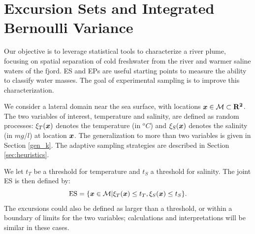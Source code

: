 \documentclass[aoas]{imsart}
\begin{document}






\section{Excursion Sets and Integrated Bernoulli Variance}
\label{sec:ESEP}

Our objective is to leverage statistical tools to characterize a river
plume, focusing on spatial separation of cold freshwater from the
river and warmer saline waters of the fjord. ES and EPs are useful
starting points to measure the ability to classify water masses. The
goal of experimental sampling is to improve this
characterization. %

We consider a lateral domain near the sea surface, with locations
${\boldsymbol x} \in \mathcal{M} \subset \mathbf{R^2}$. The two variables of
interest, temperature and salinity, are defined as random processes:
$\xi_T({\boldsymbol x})$ denotes the temperature (in $^o C$) and $\xi_S({\boldsymbol x})$
denotes the salinity (in $mg/l$) at location ${\boldsymbol x}$. The generalization
to more than two variables is given in Section \ref{gen_k}. The
adaptive sampling strategies are described in Section
\ref{sec:heuristics}.

We let $t_T$ be a threshold for temperature and $t_S$ a threshold for
salinity. The joint ES is then defined by:
\begin{equation}\label{ES}
     \mbox{ES} = \{\bx \in \mathcal{M} | \xi_T(\bx) \leq t_T,\xi_S(\bx) \leq t_S\}.
\end{equation}
The excursions could also be defined as larger than a threshold, or
within a boundary of limits for the two variables; calculations and
interpretations will be similar in these cases.
\end{document}

